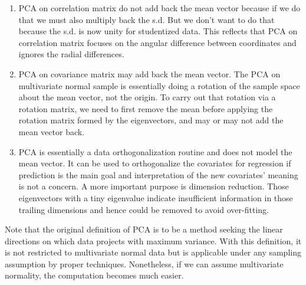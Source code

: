 \documentclass[article]{jss}
\begin{document}
        \begin{enumerate}
          \item PCA on correlation matrix do not add back the mean vector because if we do that we must also multiply back the s.d. But we don't want to do that because the s.d. is now unity for studentized data. This reflects that PCA on correlation matrix focuses on the angular difference between coordinates and ignores the radial differences.
          \item PCA on covariance matrix may add back the mean vector. The PCA on multivariate normal sample is essentially doing a rotation of the sample space about the mean vector, not the origin. To carry out that rotation via a rotation matrix, we need to first remove the mean before applying the rotation matrix formed by the eigenvectors, and may or may not add the mean vector back.
          \item PCA is essentially a data orthogonalization routine and does not model the mean vector. It can be used to orthogonalize the covariates for regression if prediction is the main goal and interpretation of the new covariates' meaning is not a concern. A more important purpose is dimension reduction. Those eigenvectors with a tiny eigenvalue indicate insufficient information in those trailing dimensions and hence could be removed to avoid over-fitting.
        \end{enumerate}
        Note that the original definition of PCA is to be a method seeking the linear directions on which data projects with maximum variance. With this definition, it is not restricted to multivariate normal data but is applicable under any sampling assumption by proper techniques. Nonetheless, if we can assume multivariate normality, the computation becomes much easier.
        
        
        
        
        
\end{document}

